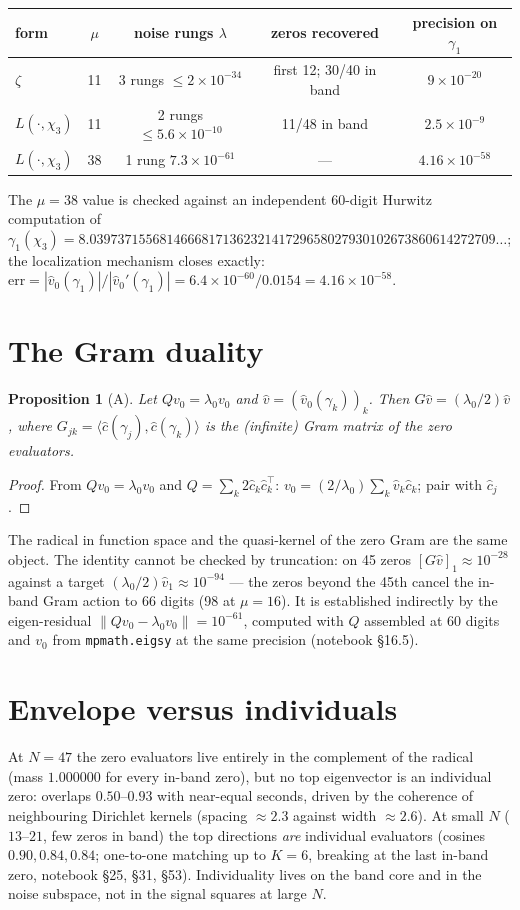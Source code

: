 \documentclass[11pt]{article}
\newtheorem{proposition}{Proposition}\newtheorem{theorem}[proposition]{Theorem}
\theoremstyle{remark}\newtheorem*{remark}{Remark}
\begin{document}
\begin{center}\small
\begin{tabular}{lcccc}\toprule
form & $\mu$ & noise rungs $\lambda$ & zeros recovered & precision on $\gamma_1$\\\midrule
$\zeta$ & 11 & 3 rungs $\le2\times10^{-34}$ & first 12; 30/40 in band & $9\times10^{-20}$\\
$L(\cdot,\chi_3)$ & 11 & 2 rungs $\le5.6\times10^{-10}$ & 11/48 in band & $2.5\times10^{-9}$\\
$L(\cdot,\chi_3)$ & 38 & 1 rung $7.3\times10^{-61}$ & --- & $4.16\times10^{-58}$\\\bottomrule
\end{tabular}
\end{center}
The $\mu=38$ value is checked against an independent 60-digit Hurwitz computation of $\gamma_1(\chi_3)=8.0397371556814666817136232141729658027930102673860614272709\ldots$; the localization mechanism closes exactly: $\mathrm{err}=|\hat v_0(\gamma_1)|/|\hat v_0'(\gamma_1)|=6.4\times10^{-60}/0.0154=4.16\times10^{-58}$.

\section{The Gram duality}
\begin{proposition}[A]
Let $Qv_0=\lambda_0v_0$ and $\hat v=(\hat v_0(\gamma_k))_k$. Then $G\hat v=(\lambda_0/2)\hat v$, where $G_{jk}=\langle\hat c(\gamma_j),\hat c(\gamma_k)\rangle$ is the (infinite) Gram matrix of the zero evaluators.
\end{proposition}
\begin{proof} From $Qv_0=\lambda_0v_0$ and $Q=\sum_k2\hat c_k\hat c_k^{\!\top}$: $v_0=(2/\lambda_0)\sum_k\hat v_k\hat c_k$; pair with $\hat c_j$. \end{proof}
The radical in function space and the quasi-kernel of the zero Gram are the same object. The identity cannot be checked by truncation: on 45 zeros $[G\hat v]_1\approx10^{-28}$ against a target $(\lambda_0/2)\hat v_1\approx10^{-94}$ --- the zeros beyond the 45th cancel the in-band Gram action to 66 digits (98 at $\mu=16$). It is established indirectly by the eigen-residual $\|Qv_0-\lambda_0v_0\|=10^{-61}$, computed with $Q$ assembled at 60 digits and $v_0$ from \texttt{mpmath.eigsy} at the same precision (notebook \S16.5).

\section{Envelope versus individuals}
At $N=47$ the zero evaluators live entirely in the complement of the radical (mass $1.000000$ for every in-band zero), but no top eigenvector is an individual zero: overlaps $0.50$--$0.93$ with near-equal seconds, driven by the coherence of neighbouring Dirichlet kernels (spacing $\approx2.3$ against width $\approx2.6$). At small $N$ ($13$--$21$, few zeros in band) the top directions \emph{are} individual evaluators (cosines $0.90,0.84,0.84$; one-to-one matching up to $K=6$, breaking at the last in-band zero, notebook \S25, \S31, \S53). Individuality lives on the band core and in the noise subspace, not in the signal squares at large $N$.
\end{document}
